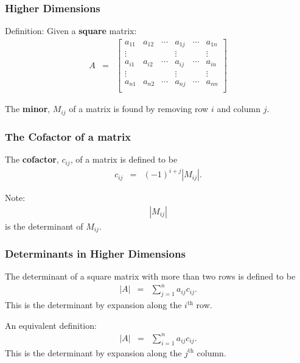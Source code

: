 \documentclass{beamer}
\begin{document}
\begin{frame}
  \frametitle{Higher Dimensions}

  Definition: Given a \textbf{square} matrix:
  \begin{eqnarray*}
    A & = & 
    \left[
      \begin{array}{rrr|r|rr}
        a_{11} & a_{12} & \cdots & a_{1j} & \cdots & a_{1n} \\
        \vdots &       &        & \vdots &        & \vdots \\ \hline
        a_{i1} & a_{i2} & \cdots & a_{ij} & \cdots & a_{in} \\ \hline
        \vdots &       &        & \vdots &        & \vdots \\
        a_{n1} & a_{n2} & \cdots & a_{nj} & \cdots & a_{nn} \\
      \end{array}
    \right]
  \end{eqnarray*}

  The \textbf{minor}, $M_{ij}$ of a matrix is found by removing row
  $i$ and column $j$.

\end{frame}


\begin{frame}
  \frametitle{The Cofactor of a matrix}

  The \textbf{cofactor}, $c_{ij}$, of a matrix is defined to be 
  \begin{eqnarray*}
    c_{ij} & = & (-1)^{i+j}\left| M_{ij} \right|.
  \end{eqnarray*}

  Note:
  \begin{eqnarray*}
    \left| M_{ij} \right|
  \end{eqnarray*}
  is the determinant of $M_{ij}$.

\end{frame}


\begin{frame}
  \frametitle{Determinants in Higher Dimensions}

  The determinant of a square matrix with more than two rows is
  defined to be
  \begin{eqnarray*}
    \left| A \right| & = & \sum^n_{j=1} a_{ij} c_{ij}.
  \end{eqnarray*}
  This is the determinant by expansion along the $i^{\mathrm{th}}$
  row.

  An equivalent definition:
  \begin{eqnarray*}
    \left| A \right| & = & \sum^n_{i=1} a_{ij} c_{ij}.
  \end{eqnarray*}
  This is the determinant by expansion along the $j^{\mathrm{th}}$
  column.

  

\end{frame}
\end{document}
